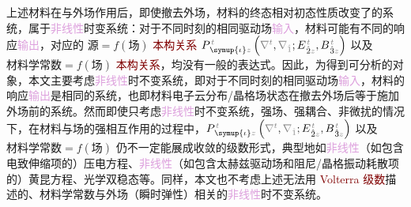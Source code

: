 上述材料在与外场作用后，即使撤去外场，材料的终态相对初态性质改变了的系统，属于\textcolor{Plum}{非线性}时变系统：对于不同时刻的相同驱动场\textcolor{Plum}{输入}，材料可能有不同的响应\textcolor{Plum}{输出}，对应的 $\text{源} = f(\text{场})$ \textcolor{Maroon}{本构关系} $P^{\;\!\mathcolor{gray}{t}}_{\;\! \symup{\iota}\mathcolor{gray}{z}} \left( \mathcolor{gray}{\nabla^t}, \mathcolor{gray}{\nabla_{\hat{1}}} ; E^{\;\!\mathcolor{gray}{t}}_{\;\! \hat{2}\mathcolor{gray}{z}}, B^{\;\!\mathcolor{gray}{t}}_{\;\! \hat{3}\mathcolor{gray}{z}} \right)$ 以及 $\text{材料学常数} = f(\text{场})$ \textcolor{Maroon}{本构关系}，均没有一般的表达式。因此，为得到可分析的对象，本文主要考虑\textcolor{Plum}{非线性}时不变系统\cite{zalevskyOpticalImplementationSecondorder2001}，即对于不同时刻的相同驱动场\textcolor{Plum}{输入}，材料的响应\textcolor{Plum}{输出}是相同的系统，也即材料电子云分布/晶格场状态在撤去外场后等于施加外场前的系统。然而即使只考虑\textcolor{Plum}{非线性}时不变系统，强场、强耦合、\textcolor{NavyBlue}{非微扰}的情况下，在材料与场的强相互作用的过程中，$P^{\;\!\mathcolor{gray}{t}}_{\;\! \symup{\iota}\mathcolor{gray}{z}} \left( \mathcolor{gray}{\nabla^t}, \mathcolor{gray}{\nabla_{\hat{1}}} ; E^{\;\!\mathcolor{gray}{t}}_{\;\! \hat{2}\mathcolor{gray}{z}}, B^{\;\!\mathcolor{gray}{t}}_{\;\! \hat{3}\mathcolor{gray}{z}} \right)$ 以及 $\text{材料学常数} = f(\text{场})$ 仍不一定能展成收敛的级数形式，典型地如\textcolor{Plum}{非线性}（如包含电致伸缩项的）压电方程、\textcolor{Plum}{非线性}（如包含太赫兹驱动场和阻尼/晶格振动耗散项的）黄昆方程\cite{wuqiangShouJiShengZiJiHuaJiYuanYuTaiHeZiGuangWuLiTeYao2024}、光学双稳态\cite{boydNonlinearOptics2019}等。同样，本文也不考虑上述无法用 \textcolor{Maroon}{Volterra 级数}\cite{pintoExactVolterraseriesComputation1982,shenNonlinearOpticalSusceptibilities2001}描述的、材料学常数与外场（瞬时弹性）相关的\textcolor{Plum}{非线性}时不变系统。

